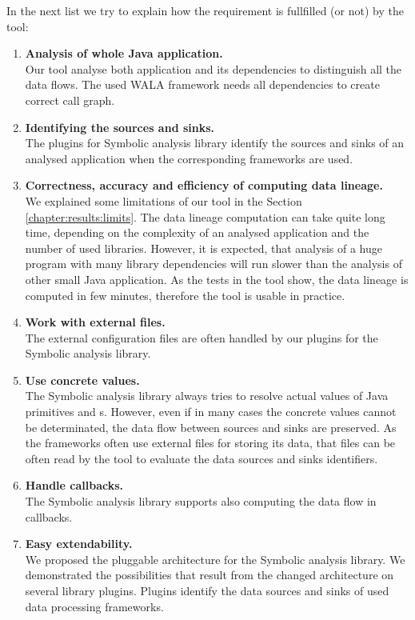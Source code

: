 In the next list we try to explain how the requirement is fullfilled (or not)
by the \ToolName tool:
\begin{enumerate}
  \item \textbf{Analysis of whole Java application.} \\
    Our tool analyse both application and its dependencies
    to distinguish all the data flows. The used WALA framework
    needs all dependencies to create correct call graph.
  \item \textbf{Identifying the sources and sinks.} \\
    The plugins for Symbolic analysis library identify the sources and sinks
    of an analysed application when the corresponding frameworks are used.
  \item \textbf{Correctness, accuracy and efficiency of computing data lineage.} \\
    We explained some limitations of our \ToolName tool in the Section \ref{chapter:results:limits}.
    The data lineage computation can take quite long time, depending on the complexity of an analysed
    application and the number of used libraries.
    However, it is expected, that analysis of a huge program with many library dependencies
    will run slower than the analysis of other small Java application.
    As the tests in the \ToolName tool show, the data lineage is computed
    in few minutes, therefore the tool is usable in practice.
  \item \textbf{Work with external files.} \\
    The external configuration files are often handled by our plugins for the Symbolic analysis library.
  \item \textbf{Use concrete values.} \\
    The Symbolic analysis library always tries to resolve actual values of Java primitives and
    s. However, even if in many cases the concrete values cannot be determinated,
    the data flow between sources and sinks are preserved.
    As the frameworks often use external files for storing its data, that files can be often read
    by the \ToolName tool to evaluate the data sources and sinks identifiers.
  \item \textbf{Handle callbacks.} \\
    The Symbolic analysis library supports also computing the data flow in callbacks.
  \item \textbf{Easy extendability.} \\
    We proposed the pluggable architecture for the Symbolic analysis library.
    We demonstrated the possibilities that result from the changed architecture
    on several library plugins. Plugins identify the data sources and sinks
    of used data processing frameworks.
\end{enumerate}


